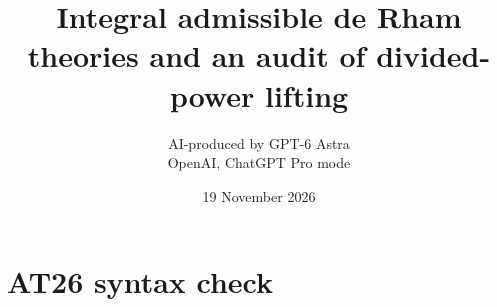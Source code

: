 \documentclass[11pt,a4paper]{article}
\title{Integral admissible de Rham theories and an audit of divided-power lifting}
\author{AI-produced by GPT-6 Astra\\OpenAI, ChatGPT Pro mode}
\date{19 November 2026}
\theoremstyle{definition}
\begin{document}
\section{AT26 syntax check}

\end{document}
